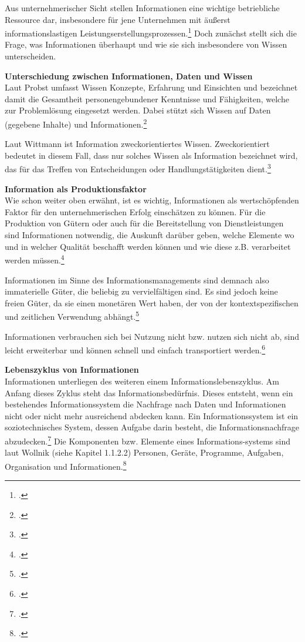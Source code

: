 Aus unternehmerischer Sicht stellen Informationen eine wichtige betriebliche Ressource dar, insbesondere für jene Unternehmen mit äußerst informationslastigen Leistungserstellungsprozessen.\footcite[Vgl. u.a.][]{BiethanMukschRusch_Informationsmanagement_2004}
Doch zunächst stellt sich die Frage, was Informationen überhaupt und wie sie sich insbesondere von Wissen unterscheiden.

\textbf{Unterschiedung zwischen Informationen, Daten und Wissen}\\
Laut Probst umfasst Wissen Konzepte, Erfahrung und Einsichten und bezeichnet damit die Gesamtheit personengebundener Kenntnisse und Fähigkeiten, welche zur Problemlösung eingesetzt werden. Dabei stützt sich Wissen auf Daten (gegebene Inhalte) und Informationen.\footcite[Vgl.][]{probst_wissen_2006}

Laut Wittmann ist Information zweckorientiertes Wissen. Zweckorientiert bedeutet in diesem Fall, dass nur solches Wissen als Information bezeichnet wird, das für das Treffen von Entscheidungen oder Handlungstätigkeiten dient.\footcite[Vgl.][14]{wittmann_unternehmung_1959}

\textbf{Information als Produktionsfaktor}\\
Wie schon weiter oben erwähnt, ist es wichtig, Informationen als wertschöpfenden Faktor für den unternehmerischen Erfolg einschätzen zu können. Für die Produktion von Gütern oder auch für die Bereitstellung von Dienstleistungen sind Informationen notwendig, die Auskunft darüber geben, welche Elemente wo und in welcher Qualität beschafft werden können und wie diese z.B. verarbeitet werden müssen.\footcite[Vgl. u.a.][]{bode_informationsbegriff_1997}

Informationen im Sinne des Informationsmanagements sind demnach also immaterielle Güter, die beliebig zu vervielfältigen sind. Es sind jedoch keine freien Güter, da sie einen monetären Wert haben, der von der kontextspezifischen und zeitlichen Verwendung abhängt.\footcite[Vgl.][21]{krcmar_informationsmanagement_2015}

Informationen verbrauchen sich bei Nutzung nicht bzw. nutzen sich nicht ab, sind leicht erweiterbar und können schnell und einfach transportiert werden.\footcite[Vgl. u.a.][]{teubner_information_2005}

\textbf{Lebenszyklus von Informationen}\\
Informationen unterliegen des weiteren einem Informationslebenszyklus. Am Anfang dieses Zyklus steht das Informationsbedürfnis. Dieses entsteht, wenn ein bestehendes Informationssystem die Nachfrage nach Daten und Informationen nicht oder nicht mehr ausreichend abdecken kann. Ein Informationssystem ist ein soziotechnisches System, dessen Aufgabe darin besteht, die Informationsnachfrage abzudecken.\footcite{GluchowskiGabrielDittmar_ManagementSupportSysteme_2008} Die Komponenten bzw. Elemente eines Informations-systems sind laut Wollnik (siehe Kapitel 1.1.2.2) Personen, Geräte, Programme, Aufgaben, Organisation und Informationen.\footcite[Vgl.][]{wollnik_referenzmodell_1988}

